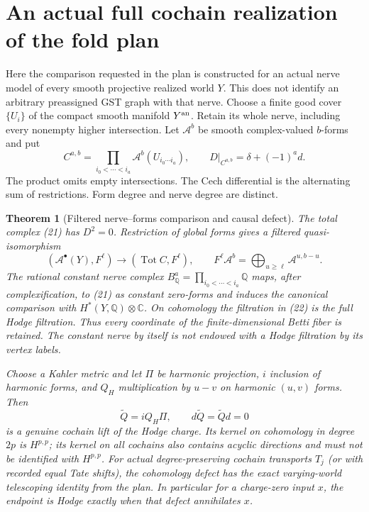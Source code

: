 \documentclass[11pt]{article}
\newtheorem{theorem}{Theorem}
\newcommand{\Q}{\mathbb Q}
\begin{document}
\section{An actual full cochain realization of the fold plan}
Here the comparison requested in the plan is constructed for an actual
nerve model of every smooth projective realized world $Y$. This does not
identify an arbitrary preassigned GST graph with that nerve.
Choose a finite good cover $\{U_i\}$ of the compact smooth manifold
$Y^{\rm an}$. Retain its whole nerve, including every nonempty higher
intersection. Let $\mathcal A^b$ be smooth complex-valued $b$-forms and put
\[
 C^{a,b}=\prod_{i_0<\cdots<i_a}\mathcal A^b(U_{i_0\cdots i_a}),
 \qquad D|_{C^{a,b}}=\delta+(-1)^a d.                 \tag{21}
\]
The product omits empty intersections. The Cech differential is the
alternating sum of restrictions. Form degree and nerve degree are distinct.
\begin{theorem}[Filtered nerve--forms comparison and causal defect]
The total complex (21) has $D^2=0$. Restriction of global forms gives a
filtered quasi-isomorphism
\[
 (\mathcal A^\bullet(Y),F^\ell)\longrightarrow
 (\operatorname{Tot}C,F^\ell),\qquad
 F^\ell\mathcal A^b=\bigoplus_{u\geq\ell}\mathcal A^{u,b-u}.       \tag{22}
\]
The rational constant nerve complex $B_\Q^a=\prod_{i_0<\cdots<i_a}\Q$
maps, after complexification, to (21) as constant zero-forms and induces
the canonical comparison with $H^*(Y,\Q)\otimes\mathbb C$.
On cohomology the filtration in (22) is the full Hodge filtration.
Thus every coordinate of the finite-dimensional Betti fiber is retained.
The constant nerve by itself is not endowed with a Hodge filtration by
its vertex labels.

Choose a Kahler metric and let $\Pi$ be harmonic projection, $i$ inclusion
of harmonic forms, and $Q_H$ multiplication by $u-v$ on harmonic $(u,v)$
forms. Then
\[
 \widetilde Q=i Q_H\Pi,\qquad
 d\widetilde Q=\widetilde Qd=0                         \tag{23}
\]
is a genuine cochain lift of the Hodge charge. Its kernel on cohomology
in degree $2p$ is $H^{p,p}$; its kernel on all cochains also contains
acyclic directions and must not be identified with $H^{p,p}$.
For actual degree-preserving cochain transports $T_j$ (or with recorded
equal Tate shifts), the cohomology defect has the exact varying-world
telescoping identity from the plan. In particular for a charge-zero input
$x$, the endpoint is Hodge exactly when that defect annihilates $x$.
\end{theorem}
\end{document}
